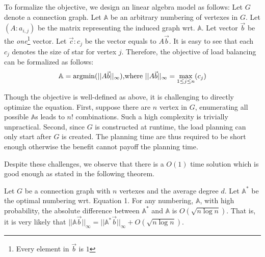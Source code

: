To formalize the objective, we design an linear algebra model as follows: Let $G$ denote a connection graph.
Let $\mathbb{A}$ be an arbitrary numbering of vertexes in $G$.
Let $(A:a_{i,j})$ be the matrix representing the induced graph wrt. $\mathbb{A}$. Let vector $\vec{b}$
be the \textit{one}\footnote{Every element in $\vec{b}$ is $1$} vector. Let $\vec{c}:c_j$ be the
vector equals to $A\vec{b}$. It is easy to see that each $c_j$ denotes the size of star for vertex $j$.
Therefore, the objective of load balancing can be formalized as follows:
\begin{equation}
\mathbb{A}  = \operatorname*{argmin}(||A\vec{b}||_\infty) \text{,where } ||A\vec{b}||_\infty = \max_{1\leq j \leq n}(c_j)
\end{equation}

Though the objective is well-defined as above, it is challenging to directly optimize
the equation. First, suppose there are $n$ vertex in $G$, enumerating
all possible $\mathbb{A}$s leads to $n!$ combinations. 
Such a high complexity is trivially unpractical. Second,
since $G$ is constructed at runtime, 
the load planning can only start after $G$ is created. 
The planning time are thus required to be short enough otherwise the benefit cannot payoff the planning time.

Despite these challenges, we observe that there is a 
$O(1)$ time solution which is good enough as stated in the 
following theorem.

\begin{theorem}
Let $G$ be a connection graph with $n$ vertexes and the average degree $d$.
Let $\mathbb{A}^*$ be the optimal numbering wrt. Equation 1.
For any numbering, $\mathbb{A}$, with high probability, the 
absolute difference between $\mathbb{A}^*$ and $\mathbb{A}$ is $O(\sqrt{n \log n})$.
That is, it is very likely that 
$||\mathbb{A}\vec{b}||_\infty = ||\mathbb{A}^*\vec{b}||_\infty + O(\sqrt{n \log n})$.
\end{theorem}

